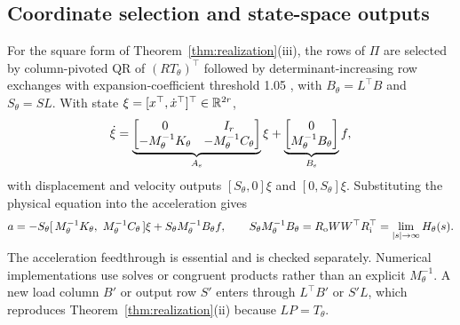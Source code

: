 \subsection{Coordinate selection and state-space outputs}\label{sec:state-details}
For the square form of Theorem~\ref{thm:realization}(iii), the rows of $\Pi$
are selected by column-pivoted QR of $(RT_\theta)^{\top}$ followed by
determinant-increasing row exchanges with expansion-coefficient threshold
1.05 \citep{golub2013}, with $B_\theta=L^{\top}B$ and $S_\theta=SL$. With state
$\xi=[x^{\top},\dot x^{\top}]^{\top}\in\mathbb R^{2r}$,
\begin{equation}
 \dot\xi=\underbrace{\begin{bmatrix}0&I_r\\-M_\theta^{-1}K_\theta&-M_\theta^{-1}C_\theta\end{bmatrix}}_{A_{\rm s}}\xi
 +\underbrace{\begin{bmatrix}0\\M_\theta^{-1}B_\theta\end{bmatrix}}_{B_{\rm s}}f,
 \label{eq:state}
\end{equation}
with displacement and velocity outputs $[S_\theta,0]\xi$ and $[0,S_\theta]\xi$.
Substituting the physical equation into the acceleration gives
\begin{equation}
 a=-S_\theta[\,M_\theta^{-1}K_\theta,\ M_\theta^{-1}C_\theta\,]\xi
   +S_\theta M_\theta^{-1}B_\theta f,\qquad
 S_\theta M_\theta^{-1}B_\theta=R_{\rm o}WW^{\top}R_{\rm i}^{\top}
 =\lim_{|s|\to\infty}H_\theta(s).
 \label{eq:feedthrough}
\end{equation}
The acceleration feedthrough is essential and is checked separately.
Numerical implementations use solves or congruent products rather than an
explicit $M_\theta^{-1}$. A new load column $B'$ or output row $S'$ enters
through $L^{\top}B'$ or $S'L$, which reproduces Theorem~\ref{thm:realization}(ii)
because $LP=T_\theta$.
